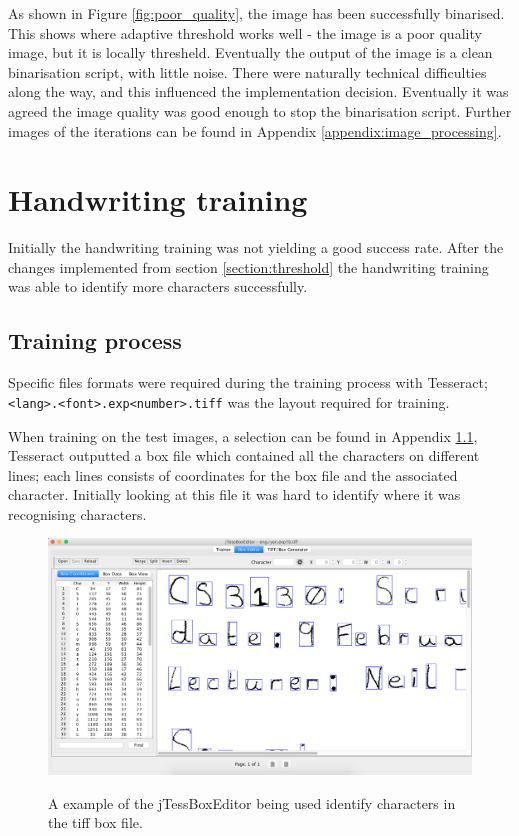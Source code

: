 As shown in Figure \ref{fig:poor_quality}, the image has been successfully binarised. This shows where adaptive threshold works well - the image is a poor quality image, but it is locally thresheld. Eventually the output of the image is a clean binarisation script, with little noise. There were naturally technical difficulties along the way, and this influenced the implementation decision. Eventually it was agreed the image quality was good enough to stop the binarisation script. Further images of the iterations can be found in Appendix \ref{appendix:image_processing}.

\section{Handwriting training}
Initially the handwriting training was not yielding a good success rate. After the changes implemented from section \ref{section:threshold} the handwriting training was able to identify more characters successfully.

\subsection{Training process}
Specific files formats were required during the training process with Tesseract; \texttt{<lang>.<font>.exp<number>.tiff} was the layout required for training.

When training on the test images, a selection can be found in Appendix \ref{}, Tesseract outputted a box file which contained all the characters on different lines; each lines consists of coordinates for the box file and the associated character. Initially looking at this file it was hard to identify where it was recognising characters.

\begin{figure}[H]
  \centering
  \includegraphics[width=\textwidth]{images/box_editor}
  \label{fig:box_editor}
  \caption{A example of the jTessBoxEditor being used identify characters in the tiff box file.}
\end{figure}


